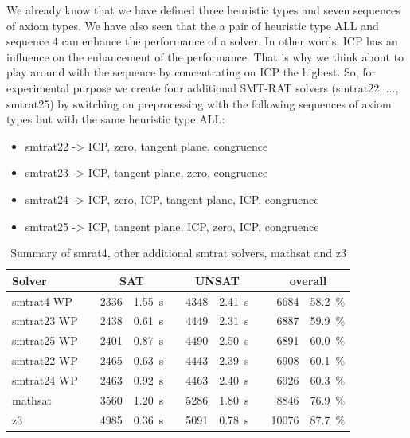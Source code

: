 \noindent We already know that we have defined three heuristic types and seven sequences of axiom types.
We have also seen that the a pair of heuristic type ALL and sequence $4$ can enhance the performance of a solver.
In other words, ICP has an influence on the enhancement of the performance.
That is why we think about to play around with the sequence by concentrating on ICP the highest.
So, for experimental purpose we create four additional SMT-RAT solvers (smtrat22, $\dots$, smtrat25) by switching on preprocessing with the following sequences of axiom types but with the same heuristic type ALL:

\begin{itemize}
    \item smtrat22 -> ICP, zero, tangent plane, congruence
    \item smtrat23 -> ICP, tangent plane, zero, congruence
    \item smtrat24 -> ICP, zero, ICP, tangent plane, ICP, congruence
    \item smtrat25 -> ICP, tangent plane, ICP, zero, ICP, congruence
\end{itemize}

\begin{table}[!ht]
\caption{Summary of smrat4, other additional smtrat solvers, mathsat and z3}
\begin{tabularx}{\textwidth}{lXrrXrrXrr}
	\toprule
	\textbf{Solver}
	&& \multicolumn{2}{c}{\textbf{SAT}}
	&& \multicolumn{2}{c}{\textbf{UNSAT}}
	&& \multicolumn{2}{c}{\textbf{overall}}
	\\
	\midrule
	smtrat4 WP
	&& 2336 & 1.55~s
	&& 4348 & 2.41~s
	&& 6684 & 58.2~\%
	\\
	smtrat23 WP
	&& 2438 & 0.61~s
	&& 4449 & 2.31~s
	&& 6887 & 59.9~\%
	\\
	smtrat25 WP
	&& 2401 & 0.87~s
	&& 4490 & 2.50~s
	&& 6891 & 60.0~\%
	\\
	smtrat22 WP
	&& 2465 & 0.63~s
	&& 4443 & 2.39~s
	&& 6908 & 60.1~\%
	\\
	smtrat24 WP
	&& 2463 & 0.92~s
	&& 4463 & 2.40~s
	&& 6926 & 60.3~\%
	\\
	mathsat
    	&& 3560 & 1.20~s
     	&& 5286 & 1.80~s
     	&& 8846 & 76.9~\%
	\\
	z3
	&& 4985 & 0.36~s
	&& 5091 & 0.78~s
	&& 10076 & 87.7~\%
	\\
	\bottomrule
\end{tabularx}
\label{table:Summary_of_smrat4_and_other_additional_smtrat_solvers}
\end{table}

